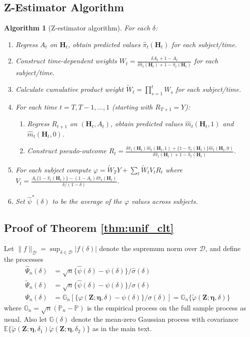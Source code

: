 \documentclass[12pt]{article}
\newcommand{\Pb}{\mathbb{P}}
\newcommand{\Pn}{\mathbb{P}_n}
\newcommand{\Gn}{\mathbb{G}_n}
\newcommand{\Gb}{\mathbb{G}}
\newcommand{\E}{\mathbb{E}}
\newcommand{\bZ}{\mathbf{Z}}
\newcommand{\bH}{\mathbf{H}}
\newtheorem{algorithm}{Algorithm}
\theoremstyle{remark}
\begin{document}
\subsection{Z-Estimator Algorithm}
\label{sec:algorithm}

\begin{algorithm}[Z-estimator algorithm] For each $\delta$:
\begin{enumerate} 
\item Regress $A_t$ on $\bH_t$, obtain predicted values $\hat\pi_t(\bH_t)$ for each subject/time.
\item Construct time-dependent weights $W_t = \frac{\delta A_t + 1-A_t}{\delta \hat\pi_t(\bH_t) + 1-\hat\pi_t(\bH_t)}$ for each subject/time.
\item Calculate cumulative product weight $\widetilde{W}_t = \prod_{s=1}^t W_s$ for each subject/time.
\item For each time $t=T, T-1, ..., 1$ (starting with $R_{T+1}=Y$):
\begin{enumerate}
\item Regress $R_{t+1}$ on $(\bH_t,A_t)$, obtain predicted values $\hat{m}_t(\bH_t,1)$ and $\hat{m}_t(\bH_t,0)$.
\item Construct pseudo-outcome $R_t=\frac{ \delta \hat\pi_t(\bH_t) \hat{m}_t(\bH_t,1) + \{1- \hat\pi_t(\bH_t)\} \hat{m}_t(\bH_t,0) } { \delta \hat\pi_t(\bH_t) + 1 - \hat\pi_t(\bH_t) }$.
\end{enumerate}
\item For each subject compute $\varphi = \widetilde{W}_T Y + \sum_t \widetilde{W}_t V_t R_t $ where $V_t = \frac{A_t \{1- \hat\pi_t(\bH_t)\} - (1-A_t) \delta \hat\pi_t(\bH_t) }{ \delta/(1-\delta)}$.
\item Set $\hat\psi^*(\delta)$ to be the average of the $\varphi$ values across subjects.
\end{enumerate}
\end{algorithm}


\subsection{Proof of Theorem \ref{thm:unif_clt}}
\label{proof:unif_clt}

Let $\| f \|_\mathcal{D} = \sup_{\delta \in \mathcal{D}} | f(\delta) |$ denote the supremum norm over $\mathcal{D}$, and define the processes
\begin{align*}
\widehat\Psi_n(\delta) &= \sqrt{n} \{\hat\psi(\delta) - \psi(\delta)\} / \hat\sigma(\delta) \\
\widetilde\Psi_n(\delta) &= \sqrt{n} \{\hat\psi(\delta) - \psi(\delta)\} / \sigma(\delta) \\
\Psi_n(\delta) &= \Gn[ \{ \varphi(\bZ;\boldsymbol{\eta},\delta)-\psi(\delta)\} /\sigma(\delta) ]  = \Gn\{ \widetilde\varphi(\bZ;\boldsymbol\eta,\delta)\}
\end{align*}
where $\Gn=\sqrt{n}(\Pn-\Pb)$ is the empirical process on the full sample process as usual. Also let $\Gb(\delta)$ denote the mean-zero Gaussian process with covariance $\E\{ \widetilde\varphi(\bZ;\boldsymbol\eta,\delta_1)\widetilde\varphi(\bZ;\boldsymbol\eta,\delta_2) \}$ as in the main text. \\
\end{document}
